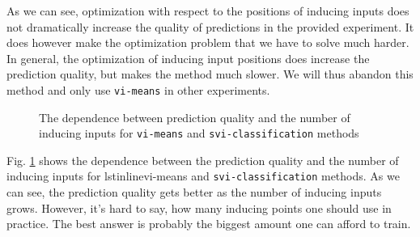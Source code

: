 As we can see, optimization with respect to the positions of inducing inputs does not dramatically increase the quality of predictions in the provided experiment. It does however make the optimization problem that we have to solve much harder. In general, the optimization of inducing input positions does increase the prediction quality, but makes the method much slower. We will thus abandon this method and only use \lstinline{vi-means} in other experiments.



% 			
% 			

\begin{figure}[!t]
	\centering
	\subfloat{
		\scalebox{0.8}{
			
		}
	}
	\subfloat{
		\scalebox{0.8}{
			
		}
	}
	\caption{The dependence between prediction quality and the number of inducing inputs for \lstinline{vi-means} and \lstinline{svi-classification} methods}
	\label{ind_inputs_results}
\end{figure}

Fig. \ref{ind_inputs_results} shows the dependence between the prediction quality and the number of inducing inputs for lstinline{vi-means} and \lstinline{svi-classification} methods. As we can see, the prediction quality gets better as the number of inducing inputs grows. However, it's hard to say, how many inducing points one should use in practice. The best answer is probably the biggest amount one can afford to train. 





